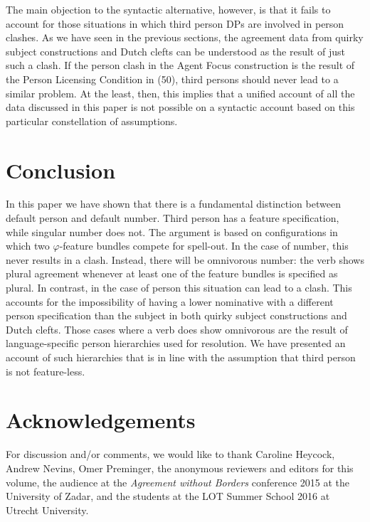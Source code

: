 \documentclass[output=paper]{langsci/langscibook}
\begin{document}
  The main objection to the syntactic alternative, however, is that it fails to account for those situations in which third person DPs are involved in person clashes. As we have seen in the previous sections, the agreement data from  quirky subject constructions and Dutch clefts can be understood as the result of just such a clash. If the person clash in the  Agent Focus construction is the result of the Person Licensing Condition in (50), third persons should never lead to a similar problem. At the least, then, this implies that a unified account of all the data discussed in this paper is not possible on a syntactic account based on this particular constellation of assumptions.

\section{Conclusion}
In this paper we have shown that there is a fundamental distinction between default person and default number. Third person has a feature specification, while singular number does not. The argument is based on configurations in which two $\varphi $-feature bundles compete for spell-out. In the case of number, this never results in a clash. Instead, there will be omnivorous number: the verb shows plural agreement whenever at least one of the feature bundles is specified as plural. In contrast, in the case of person this situation can lead to a clash. This accounts for the impossibility of having a lower nominative with a different person specification than the subject in both  quirky subject constructions and Dutch clefts. Those cases where a verb does show omnivorous  are the result of language-specific person hierarchies used for resolution. We have presented an account of such hierarchies that is in line with the assumption that third person is not feature-less. 

\section*{Acknowledgements}
For discussion and\slash or comments, we would like to thank Caroline Heycock, Andrew Nevins, Omer Preminger, the anonymous reviewers and editors for this volume, the audience at the \textit{Agreement without Borders} conference 2015 at the University of Zadar, and the students at the LOT Summer School 2016 at Utrecht University.
\end{document}
